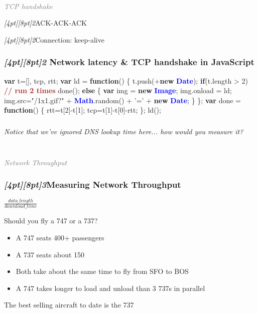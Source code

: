 \documentclass{beamer}
\newcommand{\sn}[1]{\textrm{\textit{\Huge{\raisebox{-3pt}[4pt][8pt]{\textcolor{f2elblue}{#1}}}}}\hspace{4pt}}
\newcommand{\innersplash}[1]{
  \begin{center}
    \large \textrm{\textit{ #1 } }
  \end{center}
}
\newcommand{\splashslide}[2][{}]{
  \begin{frame}
  \frametitle{#1}
  \innersplash{#2}
  \end{frame}
}
\newcommand{\leadinslide}[2]{
  \splashslide{
     {\fontsize{150}{20}\selectfont{\raisebox{0pt}[90pt][0pt]{\textcolor{light-gray}{#1}}}} \\ \huge \textcolor{gray}{#2}
  }
}
\def\brown<#1>#2{\textcolor<#1>{brown}{\textbf<#1>{#2}}}
\def\green<#1>#2{\textcolor<#1>{dark-green}{\textbf<#1>{#2}}}
\def\blue<#1>#2{\textcolor<#1>{blue}{\textbf<#1>{#2}}}
\begin{document}
\leadinslide{2}{TCP handshake}

\begin{frame}{\sn{2}ACK-ACK-ACK}
\end{frame}

\begin{frame}{\sn{2}Connection: keep-alive}
\end{frame}

\begin{frame}[fragile]
\frametitle{\sn{2} Network latency \& TCP handshake in JavaScript}
\vspace{-.3cm}
\begin{semiverbatim}
\green<1>{var} t=[], tcp, rtt;
\green<1>{var} ld = \green<1>{function}() \{
   t.push(+\green<1>{new} \blue<1>{Date});
   \green<1>{if}(t.length > 2)  \brown<1>{// run 2 times}
     done();
   \green<1>{else} \{
     \green<1>{var} img = \green<1>{new} \blue<1>{Image};
     img.onload = ld;
     img.src="/1x1.gif?" + \blue<1>{Math}.random()
                         + '=' + \green<1>{new} \blue<1>{Date};
   \}
\};
\green<1>{var} done = \green<1>{function}() \{
  rtt=t[2]-t[1];
  tcp=t[1]-t[0]-rtt;
\};
ld();
\end{semiverbatim}
\end{frame}

\splashslide{Notice that we've ignored DNS lookup time here... how would you measure it?}

\leadinslide{3}{Network Throughput}

\splashslide[\sn{3}Measuring Network Throughput]{\LARGE{\( \frac{data\_length}{download\_time} \)}}

\begin{frame}{Should you fly a 747 or a 737?}
  \begin{itemize}
  \item A 747 seats 400+ passengers
  \item A 737 seats about 150
  \item Both take about the same time to fly from SFO to BOS
  \item A 747 takes longer to load and unload than 3 737s in parallel
  \end{itemize}
  \vfill
  \tiny{The best selling aircraft to date is the 737}
\end{frame}
\end{document}
